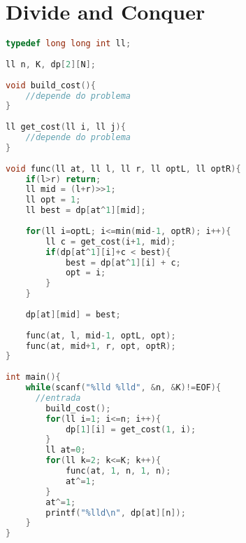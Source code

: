 \documentclass[12pt,a4paper,twoside]{report}
\begin{document}
\section{Divide and Conquer}
\noindent\begin{lstlisting}[caption=Divide and Conquer,language=C++]
typedef long long int ll;
 
ll n, K, dp[2][N];
 
void build_cost(){
    //depende do problema
}
 
ll get_cost(ll i, ll j){
    //depende do problema
}
 
void func(ll at, ll l, ll r, ll optL, ll optR){
    if(l>r) return;
    ll mid = (l+r)>>1;
    ll opt = 1;
    ll best = dp[at^1][mid];
     
    for(ll i=optL; i<=min(mid-1, optR); i++){
        ll c = get_cost(i+1, mid);
        if(dp[at^1][i]+c < best){
            best = dp[at^1][i] + c;
            opt = i;
        }
    }
     
    dp[at][mid] = best;
     
    func(at, l, mid-1, optL, opt);
    func(at, mid+1, r, opt, optR);
}
 
int main(){
    while(scanf("%lld %lld", &n, &K)!=EOF){
      //entrada
        build_cost();
        for(ll i=1; i<=n; i++){
            dp[1][i] = get_cost(1, i);
        }
        ll at=0;
        for(ll k=2; k<=K; k++){
            func(at, 1, n, 1, n);
            at^=1;
        }
        at^=1;
        printf("%lld\n", dp[at][n]);
    }
}
\end{lstlisting}
\end{document}
